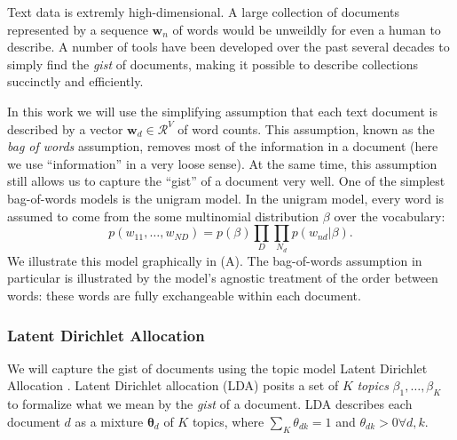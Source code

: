   Text data is extremly high-dimensional.  A large collection of
  documents represented by a sequence $\bm w_n$ of words would be
  unweildly for even a human to describe.  A number of tools have been
  developed over the past several decades to simply find the
  \emph{gist} of documents, making it possible to describe collections
  succinctly and efficiently.

  In this work we will use the simplifying assumption that each text
  document is described by a vector $\bm w_d \in \mathcal{R}^V$ of
  word counts.  This assumption, known as the \emph{bag of words}
  assumption, removes most of the information in a document (here we
  use ``information'' in a very loose sense).  At the same time, this
  assumption still allows us to capture the ``gist'' of a document
  very well. One of the simplest bag-of-words models is the unigram
  model. In the unigram model, every word is assumed to come from the
  some multinomial distribution $\beta$ over the vocabulary:
  \[
    p(w_{11}, \ldots, w_{ND}) = p(\beta) \prod_D \prod_{N_d} p(w_{nd} |
  \beta). \]
  We illustrate this model graphically in
   (A).  The bag-of-words assumption in
  particular is illustrated by the model's agnostic treatment of the
  order between words: these words are fully exchangeable within each
  document.

\subsubsection{Latent Dirichlet Allocation}
We will capture the gist of documents using the topic model Latent
Dirichlet Allocation \citep{blei:2003}.  Latent Dirichlet allocation
(LDA) posits a set of $K$ \emph{topics} $\beta_1, \ldots, \beta_K$ to
formalize what we mean by the \emph{gist} of a document.  LDA
describes each document $d$ as a mixture $\bm \theta_d$ of $K$ topics, where $\sum_K \theta_{dk} = 1$ and $\theta_{dk} > 0
\forall d,k$.

